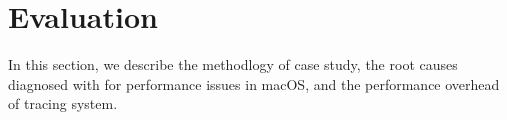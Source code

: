 \section{Evaluation}

In this section, we describe the methodlogy of case study, the root causes
diagnosed with \xxx for performance issues in macOS,  and the performance
overhead of \xxx tracing system.





